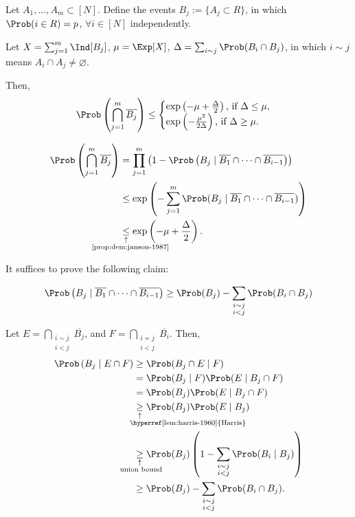 \begin{thm}[Janson, 1987]\label{thm:janson-1987}
	Let $A_1, \dots, A_m \subset [N]$. Define the events $B_j := \{A_j \subset R\}$, in which $\Prob(i \in R) = p$, $\forall i \in [N]$ independently.

	Let $X = \sum_{j=1}^m \Ind[B_j]$,  $\mu = \Exp[X]$,  $\Delta = \sum_{i \sim j} \Prob(B_i \cap B_j)$, in which  $i \sim j$ means $A_i \cap A_j \neq \varnothing$.

	Then, \[
		\Prob\left( \bigcap_{j=1}^m \overline{B_j}\right) \le
		\begin{cases}
			\exp\left(-\mu + \frac{\Delta}{2}\right)\text{, if }\Delta \le \mu,\\
			\exp\left(-\frac{\mu^2}{2\Delta}\right)\text{, if }\Delta \ge \mu.
		\end{cases}
	\]
\end{thm}
\begin{dem}
	\begin{align*}
		\Prob\left(\bigcap_{j=1}^{m} \overline{B_j}\right) &= \prod_{j=1}^{m} \left( 1 - \Prob\left( B_j \mid \overline{B_1} \cap \cdots \cap \overline{B_{i-1}}\right)\right)\\
		&\le \exp\left(- \sum_{j=1}^m \Prob(B_j \mid \overline{B_1} \cap \cdots \cap \overline{B_{i-1}})\right)\\
		&\signexpl{\le}{\cref{prop:dem:janson-1987}}{-4.5em} \exp\left(-\mu + \frac{\Delta}{2}\right).
	\end{align*}

	It suffices to prove the following claim:

	\begin{prop}\label{prop:dem:janson-1987}
		\[
		\Prob\left(B_j \mid \overline{B_1} \cap \cdots \cap \overline{B_{i-1}}\right) \ge \Prob(B_j) - \sum_{\substack{i\sim j \\ i < j}}\Prob(B_i \cap B_j)
		\]
	\end{prop}
	\begin{dem}
		Let $E = \bigcap_{\substack{i \sim j \\ i < j}}\overline{B_j}$, and $F = \bigcap_{\substack{i\not\sim j \\ i < j}} \overline{B_i}$. Then,
		\begin{align*}
			\Prob\left(B_j \mid E \cap F\right)
			&\ge \Prob(B_j \cap E \mid F) \\
			&= \Prob(B_j \mid F) \Prob(E \mid B_j \cap F)\\
			&= \Prob(B_j)\Prob(E \mid B_j \cap F)\\
			&\signexpl{\ge}{\hyperref[lem:harris-1960]{Harris}}{-1.3em} \Prob(B_j) \Prob(E \mid B_j)\\
			&\signexpl{\ge}{union bound}{-2.6em} \Prob(B_j) \left(1 - \sum_{\substack{i \sim j \\ i < j}}\Prob(B_i \mid B_j)\right)\\
			&\ge \Prob(B_j) - \sum_{\substack{i \sim j \\ i < j}}\Prob(B_i \cap B_j).
		\end{align*}
	\end{dem}
\end{dem}
